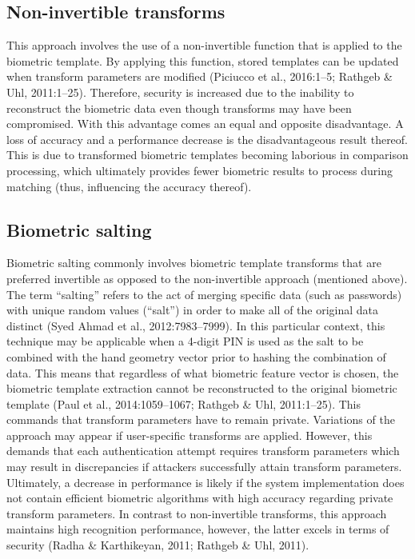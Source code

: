 	\subsection{Non-invertible transforms}
	This approach involves the use of a non-invertible function that is applied to the biometric template. By applying this function, stored templates can be updated when transform parameters are modified (Piciucco et al., 2016:1–5; Rathgeb \& Uhl, 2011:1–25). Therefore, security is increased due to the inability to reconstruct the biometric data even though transforms may have been compromised. With this advantage comes an equal and opposite disadvantage. A loss of accuracy and a performance decrease is the disadvantageous result thereof. This is due to transformed biometric templates becoming laborious in comparison processing, which ultimately provides fewer biometric results to process during matching (thus, influencing the accuracy thereof).
	
	\subsection{Biometric salting}
	Biometric salting commonly involves biometric template transforms that are preferred invertible as opposed to the non-invertible approach (mentioned above). The term “salting” refers to the act of merging specific data (such as passwords) with unique random values (“salt”) in order to make all of the original data distinct (Syed Ahmad et al., 2012:7983–7999). In this particular context, this technique may be applicable when a 4-digit PIN is used as the salt to be combined with the hand geometry vector prior to hashing the combination of data. This means that regardless of what biometric feature vector is chosen, the biometric template extraction cannot be reconstructed to the original biometric template (Paul et al., 2014:1059–1067; Rathgeb \& Uhl, 2011:1–25). This commands that transform parameters have to remain private. Variations of the approach may appear if user-specific transforms are applied. However, this demands that each authentication attempt requires transform parameters which may result in discrepancies if attackers successfully attain transform parameters. Ultimately, a decrease in performance is likely if the system implementation does not contain efficient biometric algorithms with high accuracy regarding private transform parameters. In contrast to non-invertible transforms, this approach maintains high recognition performance, however, the latter excels in terms of security (Radha \& Karthikeyan, 2011; Rathgeb \& Uhl, 2011).



